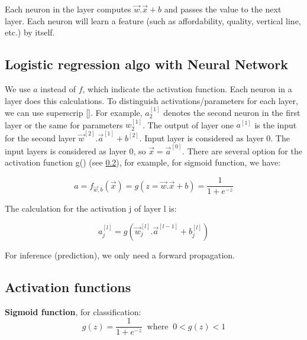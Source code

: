 \documentclass[12pt]{report}
\begin{document}
Each neuron in the layer computes $\overrightarrow{w} . \overrightarrow{x}+b$ and passes the value to the next layer. Each neuron will learn a feature (such as affordability, quality, vertical line, etc.) by itself.


\subsection{Logistic regression algo with Neural Network}
We use $a$ instead of $f$, which indicate the activation function. Each neuron in a layer does this calculations. To distinguish activations/parameters for each layer, we can use superscrip []. For example, $a_2^{[1]}$ denotes the second neuron in the first layer or the same for parameters $w_2^{[1]}$. The output of layer one $a^{[1]}$ is the input for the second layer $\overrightarrow{w}^{[2]} . \overrightarrow{a}^{[1]}+b^{[2]}$. Input layer is considered as layer 0. The input layers is considered as layer 0, so $\overrightarrow{x}=\overrightarrow{a}^{[0]}$. There are several option for the activation function g() (see \ref{sec:activation}), for example, for sigmoid function, we have:

\begin{equation}
  a= f_{\overrightarrow{w},b}(\overrightarrow{x}) = g(z=\overrightarrow{w} . \overrightarrow{x}+b) = \frac{1}{1+e^{-z}}
\end{equation}

The calculation for the activation j of layer l is:

\begin{equation}
  a_j^{[l]}= g(\overrightarrow{w}_j^{[l]} . \overrightarrow{a}^{[l-1]}+b_j^{[l]})
\end{equation}

For inference (prediction), we only need a forward propagation.




\subsection{Activation functions}
\label{sec:activation}

\textbf{Sigmoid function}, for classification:
\begin{equation}
  g(z) = \frac{1}{1+e^{-z}} \;\; \text{where} \;\; 0<g(z)<1
\end{equation}
\end{document}
